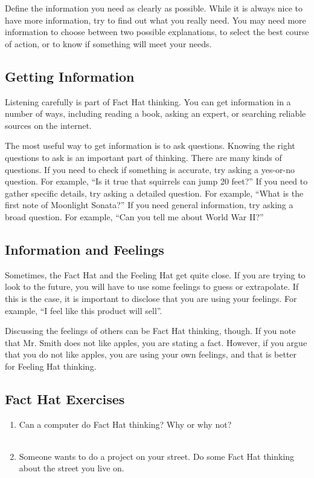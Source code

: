 Define the information you need as clearly as possible. While it is always nice to have more information, try to find out what you really need. You may need more information to choose between two possible explanations, to select the best course of action, or to know if something will meet your needs.

\subsection*{Getting Information}
Listening carefully is part of Fact Hat thinking. You can get information in a number of ways, including reading a book, asking an expert, or searching reliable sources on the internet. 

The most useful way to get information is to ask questions. Knowing the right questions to ask is an important part of thinking. There are many kinds of questions. If you need to check if something is accurate, try asking a yes-or-no question. For example, ``Is it true that squirrels can jump 20 feet?'' If you need to gather specific details, try asking a detailed question. For example, ``What is the first note of Moonlight Sonata?'' If you need general information, try asking a broad question. For example, ``Can you tell me about World War II?''

\subsection*{Information and Feelings}
Sometimes, the Fact Hat and the Feeling Hat get quite close. If you are trying to look to the future, you will have to use some feelings to guess or extrapolate. If this is the case, it is important to disclose that you are using your feelings. For example, ``I feel like this product will sell''.

Discussing the feelings of others can be Fact Hat thinking, though. If you note that Mr. Smith does not like apples, you are stating a fact. However, if you argue that you do not like apples, you are using your own feelings, and that is better for Feeling Hat thinking.


\subsection*{Fact Hat Exercises}
\begin{enumerate}
	\item Can a computer do Fact Hat thinking? Why or why not? \\~\\
	\item Someone wants to do a project on your street. Do some Fact Hat thinking about the street you live on.
\end{enumerate}

